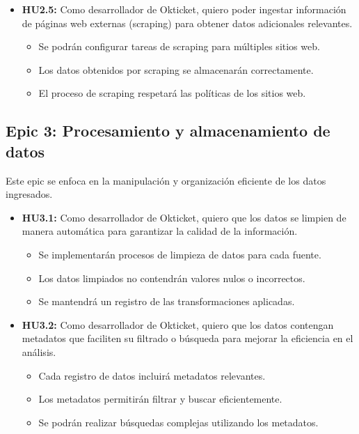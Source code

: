 \begin{itemize}
    \item \textbf{HU2.5:} Como desarrollador de Okticket, quiero poder ingestar
    información de páginas web externas (scraping) para obtener datos
    adicionales relevantes.
    \begin{itemize}
        \item Se podrán configurar tareas de scraping para múltiples sitios web.
        \item Los datos obtenidos por scraping se almacenarán correctamente.
        \item El proceso de scraping respetará las políticas de los sitios web.
    \end{itemize}
\end{itemize}


\newpage{}
\subsection{Epic 3: Procesamiento y almacenamiento de datos}
Este epic se enfoca en la manipulación y organización eficiente de los datos
ingresados.

\begin{itemize}
    \item \textbf{HU3.1:} Como desarrollador de Okticket, quiero que los datos
    se limpien de manera automática para garantizar la calidad de la
    información.
    \begin{itemize}
        \item Se implementarán procesos de limpieza de datos para cada fuente.
        \item Los datos limpiados no contendrán valores nulos o incorrectos.
        \item Se mantendrá un registro de las transformaciones aplicadas.
    \end{itemize}

    \item \textbf{HU3.2:} Como desarrollador de Okticket, quiero que los datos
    contengan metadatos que faciliten su filtrado o búsqueda para mejorar la
    eficiencia en el análisis.
    \begin{itemize}
        \item Cada registro de datos incluirá metadatos relevantes.
        \item Los metadatos permitirán filtrar y buscar eficientemente.
        \item Se podrán realizar búsquedas complejas utilizando los metadatos.
    \end{itemize}
\end{itemize}


